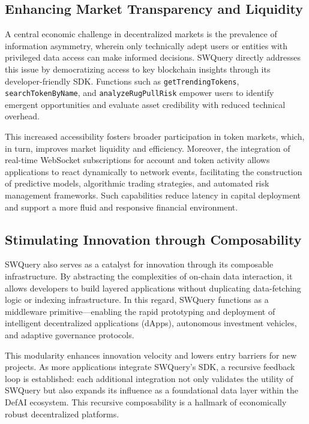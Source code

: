 \documentclass[
]{article}
\begin{document}
\subsection{Enhancing Market Transparency and Liquidity}

A central economic challenge in decentralized markets is the prevalence of information asymmetry, wherein only technically adept users or entities with privileged data access can make informed decisions. SWQuery directly addresses this issue by democratizing access to key blockchain insights through its developer-friendly SDK. Functions such as \texttt{getTrendingTokens}, \texttt{searchTokenByName}, and \texttt{analyzeRugPullRisk} empower users to identify emergent opportunities and evaluate asset credibility with reduced technical overhead.

This increased accessibility fosters broader participation in token markets, which, in turn, improves market liquidity and efficiency. Moreover, the integration of real-time WebSocket subscriptions for account and token activity allows applications to react dynamically to network events, facilitating the construction of predictive models, algorithmic trading strategies, and automated risk management frameworks. Such capabilities reduce latency in capital deployment and support a more fluid and responsive financial environment.

\subsection{Stimulating Innovation through Composability}

SWQuery also serves as a catalyst for innovation through its composable infrastructure. By abstracting the complexities of on-chain data interaction, it allows developers to build layered applications without duplicating data-fetching logic or indexing infrastructure. In this regard, SWQuery functions as a middleware primitive—enabling the rapid prototyping and deployment of intelligent decentralized applications (dApps), autonomous investment vehicles, and adaptive governance protocols.

This modularity enhances innovation velocity and lowers entry barriers for new projects. As more applications integrate SWQuery's SDK, a recursive feedback loop is established: each additional integration not only validates the utility of SWQuery but also expands its influence as a foundational data layer within the DefAI ecosystem. This recursive composability is a hallmark of economically robust decentralized platforms.
\end{document}
